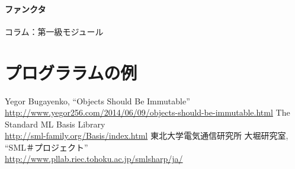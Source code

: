\documentclass[11pt,a4paper]{article}
\begin{document}
\subsection{ファンクタ}

\begin{itembox}[l]{コラム：第一級モジュール}
\end{itembox}

\part{プログララムの例}

\begin{thebibliography}{9}
   Yegor Bugayenko, ``Objects Should Be Immutable''\\
    \url{http://www.yegor256.com/2014/06/09/objects-should-be-immutable.html}
   The Standard ML Basis Library \\
    \url{http://sml-family.org/Basis/index.html}
   東北大学電気通信研究所 大堀研究室, ``SML＃プロジェクト''\\
    \url{http://www.pllab.riec.tohoku.ac.jp/smlsharp/ja/}
\end{thebibliography}
\end{document}
